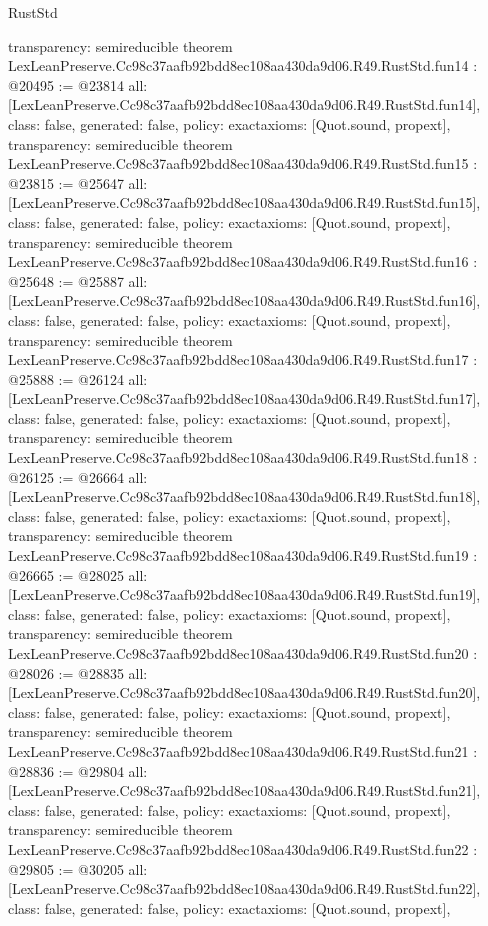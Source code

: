 \begin{lexlean}{RustStd}
\begin{coremodule}
{  transparency: semireducible
}
theorem LexLeanPreserve.Cc98c37aafb92bdd8ec108aa430da9d06.R49.RustStd.fun14 : @20495 := @23814 {
  all: [LexLeanPreserve.Cc98c37aafb92bdd8ec108aa430da9d06.R49.RustStd.fun14],
  class: false,
  generated: false,
  policy: exact{axioms: [Quot.sound, propext]},
  transparency: semireducible
}
theorem LexLeanPreserve.Cc98c37aafb92bdd8ec108aa430da9d06.R49.RustStd.fun15 : @23815 := @25647 {
  all: [LexLeanPreserve.Cc98c37aafb92bdd8ec108aa430da9d06.R49.RustStd.fun15],
  class: false,
  generated: false,
  policy: exact{axioms: [Quot.sound, propext]},
  transparency: semireducible
}
theorem LexLeanPreserve.Cc98c37aafb92bdd8ec108aa430da9d06.R49.RustStd.fun16 : @25648 := @25887 {
  all: [LexLeanPreserve.Cc98c37aafb92bdd8ec108aa430da9d06.R49.RustStd.fun16],
  class: false,
  generated: false,
  policy: exact{axioms: [Quot.sound, propext]},
  transparency: semireducible
}
theorem LexLeanPreserve.Cc98c37aafb92bdd8ec108aa430da9d06.R49.RustStd.fun17 : @25888 := @26124 {
  all: [LexLeanPreserve.Cc98c37aafb92bdd8ec108aa430da9d06.R49.RustStd.fun17],
  class: false,
  generated: false,
  policy: exact{axioms: [Quot.sound, propext]},
  transparency: semireducible
}
theorem LexLeanPreserve.Cc98c37aafb92bdd8ec108aa430da9d06.R49.RustStd.fun18 : @26125 := @26664 {
  all: [LexLeanPreserve.Cc98c37aafb92bdd8ec108aa430da9d06.R49.RustStd.fun18],
  class: false,
  generated: false,
  policy: exact{axioms: [Quot.sound, propext]},
  transparency: semireducible
}
theorem LexLeanPreserve.Cc98c37aafb92bdd8ec108aa430da9d06.R49.RustStd.fun19 : @26665 := @28025 {
  all: [LexLeanPreserve.Cc98c37aafb92bdd8ec108aa430da9d06.R49.RustStd.fun19],
  class: false,
  generated: false,
  policy: exact{axioms: [Quot.sound, propext]},
  transparency: semireducible
}
theorem LexLeanPreserve.Cc98c37aafb92bdd8ec108aa430da9d06.R49.RustStd.fun20 : @28026 := @28835 {
  all: [LexLeanPreserve.Cc98c37aafb92bdd8ec108aa430da9d06.R49.RustStd.fun20],
  class: false,
  generated: false,
  policy: exact{axioms: [Quot.sound, propext]},
  transparency: semireducible
}
theorem LexLeanPreserve.Cc98c37aafb92bdd8ec108aa430da9d06.R49.RustStd.fun21 : @28836 := @29804 {
  all: [LexLeanPreserve.Cc98c37aafb92bdd8ec108aa430da9d06.R49.RustStd.fun21],
  class: false,
  generated: false,
  policy: exact{axioms: [Quot.sound, propext]},
  transparency: semireducible
}
theorem LexLeanPreserve.Cc98c37aafb92bdd8ec108aa430da9d06.R49.RustStd.fun22 : @29805 := @30205 {
  all: [LexLeanPreserve.Cc98c37aafb92bdd8ec108aa430da9d06.R49.RustStd.fun22],
  class: false,
  generated: false,
  policy: exact{axioms: [Quot.sound, propext]},
}
\end{coremodule}
\end{lexlean}
